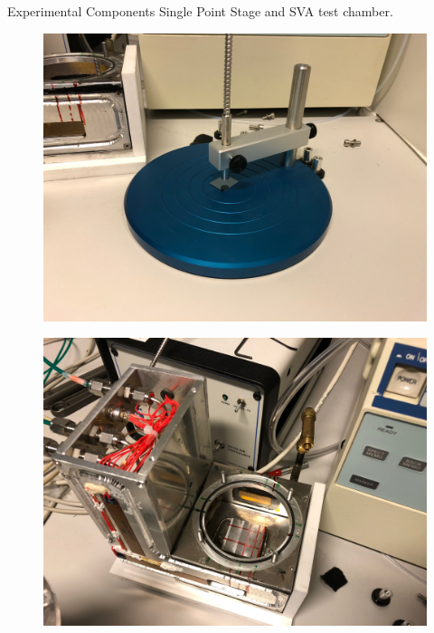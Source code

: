 \documentclass[10pt]{beamer}
\begin{document}
\begin{frame}{Experimental Components}
Single Point Stage and SVA test chamber.
\begin{minipage}{0.47\textwidth}
\begin{figure}
\includegraphics[scale=0.04]{setup3.JPG}
\end{figure}
\end{minipage}
\begin{minipage}{0.5\textwidth}
\begin{figure}
\includegraphics[scale=0.04]{setup4.JPG}
\end{figure}
\end{minipage}
\end{frame}
\end{document}

